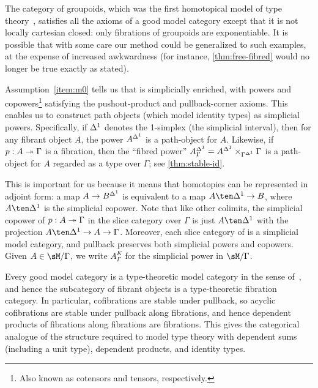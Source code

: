 \documentclass[referee]{psp}
\begin{document}
\begin{noneg}
The category of groupoids, which was the first homotopical model of type theory~\cite{hs:gpd-typethy}, satisfies all the axioms of a good model category except that it is not locally cartesian closed: only fibrations of groupoids are exponentiable.
It is possible that with some care our method could be generalized to such examples, at the expense of increased awkwardness (for instance, \cref{thm:free-fibred} would no longer be true exactly as stated).
\end{noneg}

Assumption~\ref{item:m0} tells us that \sM is simplicially enriched, with powers and copowers\footnote{Also known as cotensors and tensors, respectively.} satisfying the pushout-product and pullback-corner axioms.
This enables us to construct path objects (which model identity types) as simplicial powers.
Specifically, if ${\Delta^1}$ denotes the 1-simplex (the simplicial interval), then for any fibrant object $A$, the power $A^{\Delta^1}$ is a path-object for $A$.
Likewise, if $p:A\twoheadrightarrow \Gamma$ is a fibration, then the ``fibred power'' $A^{\Delta^1}_\Gamma = A^{\Delta^1} \times_{\Gamma^{\Delta^1}} \Gamma$ is a path-object for $A$ regarded as a type over $\Gamma$; see \cref{thm:stable-id}.

This is important for us because it means that homotopies can be represented in adjoint form: a map $A\to B^{\Delta^1}$ is equivalent to a map $A\ten \ivl \to B$, where $A\ten \ivl$ is the simplicial copower.
Note that like other colimits, the simplicial copower of $p:A\twoheadrightarrow \Gamma$ in the slice category over $\Gamma$ is just $A\ten\ivl$ with the projection $A\ten\ivl \to A \to \Gamma$.
Moreover, each slice category of \sM is a simplicial model category, and pullback preserves both simplicial powers and copowers.
Given $A\in\sM/\Gamma$, we write $A^K_\Gamma$ for the simplicial power in $\sM/\Gamma$.

Every good model category is a type-theoretic model category in the sense of~\cite{shulman:invdia}, and hence the subcategory of fibrant objects is a type-theoretic fibration category.
In particular, cofibrations are stable under pullback, so acyclic cofibrations are stable under pullback along fibrations, and hence dependent products of fibrations along fibrations are fibrations.
This gives the categorical analogue of the structure required to model type theory with dependent sums (including a unit type), dependent products, and identity types.
\end{document}
